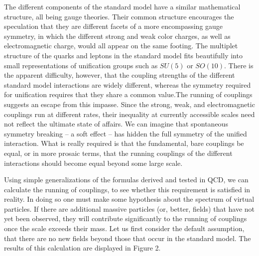 \documentclass[12pt]{article}
\begin{document}
The different components of
the standard model have a similar mathematical structure, all being
gauge theories.  Their common structure encourages the speculation
that they are different facets of a more encompassing gauge symmetry,
in which the different strong and weak color charges, as well as
electromagnetic charge, would all appear on the same footing.  The
multiplet structure of the quarks and leptons in the standard model
fits beautifully into small representations of unification groups such
as $SU(5)$ or $SO(10)$.  There is the apparent difficulty, however,
that the coupling strengths of the different standard model
interactions are widely different, whereas the symmetry required for
unification requires that they share a common value.The running of
couplings suggests an escape from this impasse.  Since the strong,
weak, and electromagnetic couplings run at different rates, their
inequality at currently accessible scales need not reflect the
ultimate state of affairs.  We can imagine that spontaneous symmetry
breaking -- a soft effect -- has hidden the full symmetry of the
unified interaction.  What is really required is that the fundamental,
bare couplings be equal, or in more prosaic terms, that the running
couplings of the different interactions should become equal beyond
some large scale.  

Using simple generalizations of the formulas
derived and tested in QCD, we can calculate the running of couplings,
to see whether this requirement is satisfied in reality.  
In doing so one must make
some hypothesis about the spectrum of virtual particles.  If there are
additional massive particles (or, better, fields) that have not yet
been observed, they will contribute significantly to the running of
couplings once the scale exceeds their mass. Let us first consider the
default assumption, that there are no new fields beyond those that
occur in the standard model.  The results of this calculation are
displayed in Figure 2. 
\end{document}
